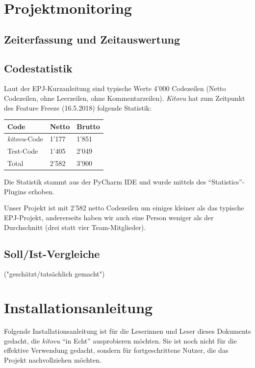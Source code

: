 \documentclass[a4paper]{article}
\let\oldsection\section
\renewcommand\section{\clearpage\oldsection}
\begin{document}
\section{Projektmonitoring}

\subsection{Zeiterfassung und Zeitauswertung}


\subsection{Codestatistik}

Laut der EPJ-Kurzanleitung sind typische Werte 4'000 Codezeilen (Netto Codezeilen, ohne Leerzeilen, ohne Kommentarzeilen). \emph{Kitovu} hat zum Zeitpunkt des Feature Freeze (16.5.2018) folgende Statistik:

\begin{tabulary}{\linewidth}{lll}
  \toprule
  \textbf{Code} & \textbf{Netto} & \textbf{Brutto} \\
  \midrule
  \emph{kitovu}-Code & 1'177 & 1'851 \\
  Test-Code & 1'405 & 2'049 \\
  \midrule
  Total & 2'582 & 3'900 \\
  \bottomrule
\end{tabulary}

Die Statistik stammt aus der PyCharm IDE und wurde mittels des ``Statistics''-Plugins erhoben.

Unser Projekt ist mit 2'582 netto Codezeilen um einiges kleiner als das typische EPJ-Projekt, andererseits haben wir auch eine Person weniger als der Durchschnitt (drei statt vier Team-Mitglieder).

\subsection{Soll/Ist-Vergleiche}

 ("geschätzt/tatsächlich gemacht")


\section{Installationsanleitung}

Folgende Installationsanleitung ist für die Leserinnen und Leser dieses Dokuments gedacht, die \emph{kitovu} ``in Echt'' ausprobieren möchten. Sie ist noch nicht für die effektive Verwendung gedacht, sondern für fortgeschrittene Nutzer, die das Projekt nachvollziehen möchten.
\end{document}
